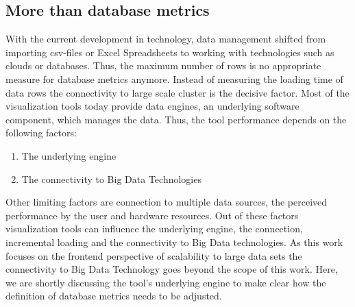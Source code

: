 \subsection*{More than database metrics}
With the current development in technology, data management shifted from importing csv-files or Excel Spreadsheets to working with technologies such as clouds or databases. Thus, the maximum number of rows is no appropriate measure for database metrics anymore. Instead of measuring the loading time of data rows the connectivity to large scale cluster is the decisive factor. Most of the visualization tools today provide data engines, an underlying software component, which manages the data. Thus, the tool performance depends on the following factors:
\begin{enumerate}
    \item The underlying engine
    \item The connectivity to Big Data Technologies
\end{enumerate}
Other limiting factors are connection to multiple data sources, the perceived performance by the user and hardware resources.  Out of these factors visualization tools can influence the underlying engine, the connection, incremental loading and the connectivity to Big Data technologies. As this work focuses on the frontend perspective of scalability to large data sets the connectivity to Big Data Technology goes beyond the scope of this work. Here, we are shortly discussing the tool's underlying engine to make clear how the definition of database metrics needs to be adjusted. 

